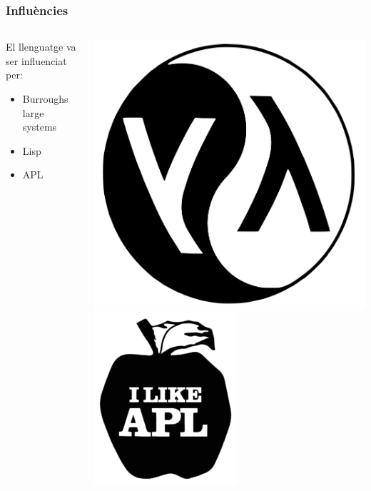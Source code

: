 \documentclass{beamer}
\begin{document}
\begin{frame}
    \frametitle{Influències}
    \begin{columns}[c]
        \begin{column}{0.7\linewidth}
            El llenguatge va ser influenciat per:
            \begin{itemize}
                \item Burroughs large systems
                \item Lisp
                \item APL
            \end{itemize}
        \end{column}
        \begin{column}{0.3\linewidth}
            \centering
            \includegraphics[width=.8\linewidth]{lisplogo}\\
            \includegraphics[width=.8\linewidth]{apllogo}
        \end{column}
    \end{columns}
\end{frame}
\end{document}
